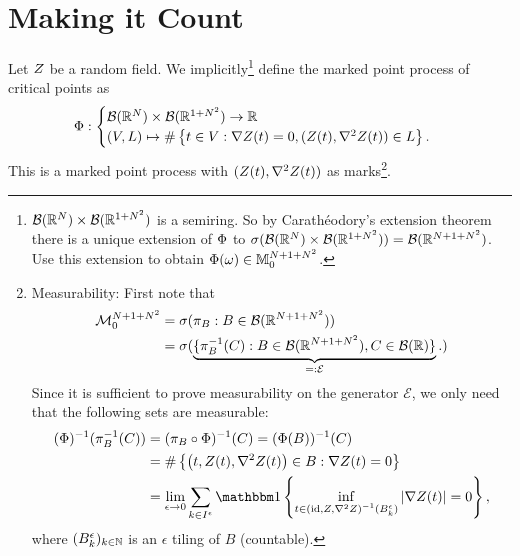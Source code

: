 \section{Making it Count}

\begin{definition}
	Let \(\rf\) be a random field. We implicitly\footnote{
		\(\borel(\real^\dims)\times\borel(\real^{1+\dims^2})\) is a semiring. So by
		Carathéodory's extension theorem there is a unique extension of
		\(\pp\) to
		\(\sigma(\borel(\real^\dims)\times\borel(\real^{1+\dims^2}))=\borel(\real^{\dims+1+\dims^2})\).
		Use this extension to obtain \(\pp(\omega)\in\locFiniteMeasure[\dims+1+\dims^2]\).
	} define the marked point process of critical points as
	\begin{align*}
		\pp:
		\begin{cases}
			\borel(\real^\dims)\times\borel(\real^{1+\dims^2}) \to \real\\
			(\Vol, L) \mapsto
			\#\left\{t\in\Vol:
				\nabla\rf(t)=0,
				(\rf(t), \nabla^2 \rf(t))\in L
			\right\}.
		\end{cases}
	\end{align*}
	This is a marked point process with \((\rf(t), \nabla^2\rf(t))\) as marks\footnote{
		Measurability: First note that	
		\begin{align*}
			\locFiniteMeasAlg[\dims+1+\dims^2]
			&= \sigma(\pi_B : B\in\borel(\real^{\dims+1+\dims^2}))\\
			&=\sigma(\underbrace{
				\{\pi_B^{-1}(C) : B\in\borel(\real^{\dims+1+\dims^2}), C\in\borel(\real)\}
			}_{=:\mathcal{E}}.
			)
		\end{align*}
		Since it is sufficient to prove measurability on the generator
		\(\mathcal{E}\), we only need that the following sets are measurable:
		\begin{align*}
			(\pp)^{-1}(\pi^{-1}_{B}(C))
			&= (\pi_{B} \circ \pp)^{-1}(C)
			= (\pp(B))^{-1}(C)\\
			&= \#\left\{\left(t,\rf(t),\nabla^2\rf(t)\right) \in B:
				\nabla\rf(t)=0
			\right\}\\
			&= \lim_{\epsilon\to 0} \sum_{k\in I^\epsilon}
			\ind\left\{
				\inf_{t\in \left(\text{id}, \rf, \nabla^2\rf\right)^{-1}(B^\epsilon_k) }
			|\nabla \rf(t)| = 0
			\right\},
		\end{align*}
		where \((B^\epsilon_k)_{k\in\nat}\) is an \(\epsilon\) tiling of \(B\) (countable).
	}.
\end{definition}

